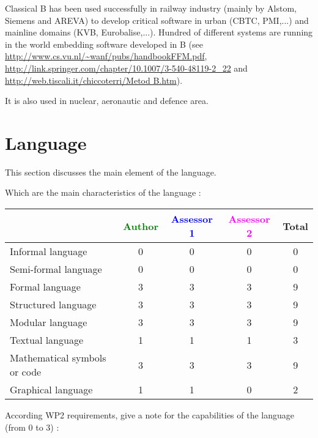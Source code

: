 \begin{author_comment}

Classical B has been used successfully  in railway  industry (mainly by Alstom, Siemens and AREVA) to  develop critical software in urban (CBTC, PMI,...) and mainline domains (KVB, Eurobalise,...). Hundred of different systems are running in the world embedding software developed in B (see \url{http://www.cs.vu.nl/~wanf/pubs/handbookFFM.pdf}, \url{http://link.springer.com/chapter/10.1007/3-540-48119-2_22} and \url{http://web.tiscali.it/chiccoterri/Metod B.htm}).

It is also used in nuclear, aeronautic and defence area.

\end{author_comment}


\section{Language}
This section discusses the main element of the language.

Which are the main characteristics of the language :

\begin{tabular}{|l | c | c | c | c|}
\hline
& \textcolor{green}{Author} & \textcolor{blue}{Assessor 1} & \textcolor{magenta}{Assessor 2} & Total \\
\hline 
Informal language & 0 & 0 & 0 & 0 \\
\hline 
Semi-formal language & 0 & 0 & 0 & 0 \\
\hline
Formal language & 3 & 3 & 3 & 9 \\
\hline
Structured language & 3 & 3 & 3 & 9 \\
\hline
Modular language & 3 & 3 & 3 & 9 \\
\hline
Textual language & 1 & 1 & 1 & 3 \\
\hline
Mathematical symbols or code & 3 & 3 & 3 & 9 \\
\hline
Graphical language & 1 & 1 & 0 & 2 \\
\hline
\end{tabular}

According WP2 requirements, give a note for the capabilities of the language (from 0 to 3) :


